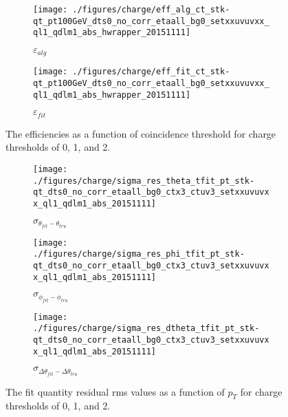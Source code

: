 \begin{figure}[!htbp]\captionsetup{justification=centering}\captionsetup{justification=centering}
  \begin{center}
\begin{subfigure}[t]{0.45\textwidth\textwidth}\centering\texttt{[image: ./figures/charge/eff\_alg\_ct\_stk-qt\_pt100GeV\_dts0\_no\_corr\_etaall\_bg0\_setxxuvuvxx\_ql1\_qdlm1\_abs\_hwrapper\_20151111]}\caption{$\varepsilon_{alg}$}\end{subfigure}
\begin{subfigure}[t]{0.45\textwidth\textwidth}\centering\texttt{[image: ./figures/charge/eff\_fit\_ct\_stk-qt\_pt100GeV\_dts0\_no\_corr\_etaall\_bg0\_setxxuvuvxx\_ql1\_qdlm1\_abs\_hwrapper\_20151111]}\caption{$\varepsilon_{fit}$}\end{subfigure}
  \caption{\label{fig:effqt} The efficiencies as a function of coincidence threshold for charge thresholds of 0, 1, and 2.}
  \end{center}
\end{figure}

\begin{figure}[!htbp]\captionsetup{justification=centering}\captionsetup{justification=centering}
  \begin{center}
\begin{subfigure}[t]{0.32\textwidth\textwidth}\centering\texttt{[image: ./figures/charge/sigma\_res\_theta\_tfit\_pt\_stk-qt\_dts0\_no\_corr\_etaall\_bg0\_ctx3\_ctuv3\_setxxuvuvxx\_ql1\_qdlm1\_abs\_20151111]}\caption{$\sigma_{\theta_{fit}-\theta_{tru}}$}\end{subfigure}
\begin{subfigure}[t]{0.32\textwidth\textwidth}\centering\texttt{[image: ./figures/charge/sigma\_res\_phi\_tfit\_pt\_stk-qt\_dts0\_no\_corr\_etaall\_bg0\_ctx3\_ctuv3\_setxxuvuvxx\_ql1\_qdlm1\_abs\_20151111]}\caption{$\sigma_{\phi_{fit}-\phi_{tru}}$}\end{subfigure}
\begin{subfigure}[t]{0.32\textwidth\textwidth}\centering\texttt{[image: ./figures/charge/sigma\_res\_dtheta\_tfit\_pt\_stk-qt\_dts0\_no\_corr\_etaall\_bg0\_ctx3\_ctuv3\_setxxuvuvxx\_ql1\_qdlm1\_abs\_20151111]}\caption{$\sigma_{\Delta\theta_{fit}-\Delta\theta_{tru}}$}\end{subfigure}
  \caption{\label{fig:resqt} The fit quantity residual rms values as a function of $p_T$ for charge thresholds of 0, 1, and 2.}
  \end{center}
\end{figure}
\clearpage
